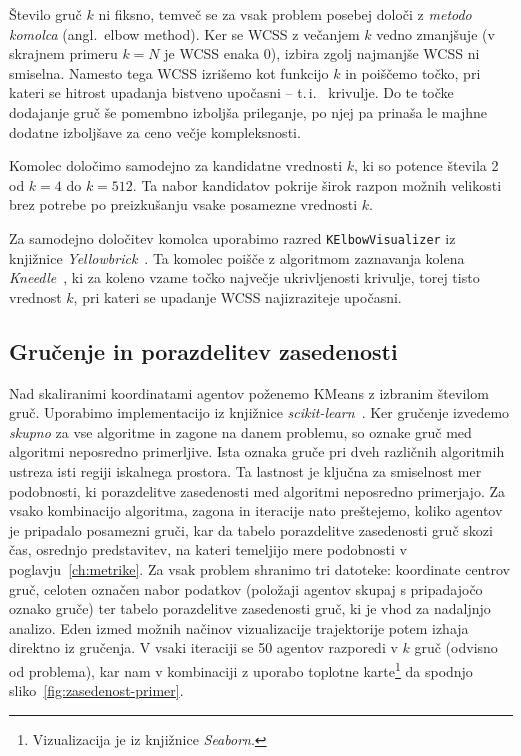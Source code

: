\documentclass[a4paper, 12pt]{book}
\begin{document}
Število gruč $k$ ni fiksno, temveč se za vsak problem posebej določi z
\emph{metodo komolca} (angl.\ elbow method). Ker se WCSS z večanjem $k$
vedno zmanjšuje (v skrajnem primeru $k=N$ je WCSS enaka 0), izbira zgolj
najmanjše WCSS ni smiselna. Namesto tega WCSS izrišemo kot funkcijo $k$ in
poiščemo točko, pri kateri se hitrost upadanja bistveno upočasni -- t.\,i.\
 krivulje. Do te točke dodajanje gruč še pomembno izboljša
prileganje, po njej pa prinaša le majhne dodatne izboljšave za ceno večje
kompleksnosti.

Komolec določimo samodejno za kandidatne vrednosti $k$, ki so potence
števila 2 od $k=4$ do $k=512$. Ta nabor kandidatov
pokrije širok razpon možnih velikosti brez potrebe po preizkušanju vsake
posamezne vrednosti $k$.

Za samodejno določitev komolca uporabimo razred \texttt{KElbowVisualizer} iz
knjižnice \emph{Yellowbrick}~\cite{bengfort2019yellowbrick}. Ta komolec
poišče z algoritmom zaznavanja kolena \emph{Kneedle}~\cite{satopaa2011kneedle},
ki za koleno vzame točko največje ukrivljenosti krivulje, torej tisto vrednost $k$, pri kateri se upadanje WCSS najizraziteje upočasni.

\clearpage

\subsection{Gručenje in porazdelitev zasedenosti}

Nad skaliranimi koordinatami agentov poženemo KMeans z izbranim številom
gruč. Uporabimo implementacijo iz knjižnice
\emph{scikit-learn}~\cite{pedregosa2011scikit}. Ker gručenje izvedemo \emph{skupno} za vse algoritme in zagone na
danem problemu, so oznake gruč med algoritmi neposredno primerljive. Ista
oznaka gruče pri dveh različnih algoritmih ustreza isti regiji iskalnega
prostora. Ta lastnost je ključna za smiselnost mer podobnosti, ki
porazdelitve zasedenosti med algoritmi neposredno primerjajo.
Za vsako kombinacijo algoritma, zagona in iteracije nato preštejemo, koliko
agentov je pripadalo posamezni gruči, kar da tabelo porazdelitve zasedenosti gruč skozi čas, osrednjo predstavitev, na kateri temeljijo mere podobnosti
v poglavju~\ref{ch:metrike}.
Za vsak problem shranimo tri datoteke: koordinate centrov gruč, celoten
označen nabor podatkov (položaji agentov skupaj s pripadajočo oznako gruče)
ter tabelo porazdelitve zasedenosti gruč, ki je vhod za nadaljnjo analizo.
Eden izmed možnih načinov vizualizacije trajektorije potem izhaja direktno iz gručenja. V vsaki iteraciji se 50 agentov razporedi v $k$ gruč (odvisno od problema), kar nam v kombinaciji z uporabo toplotne karte\footnote{Vizualizacija je iz knjižnice \emph{Seaborn}.} da spodnjo sliko~\ref{fig:zasedenost-primer}.
\end{document}

